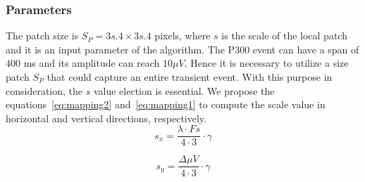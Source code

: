 \documentclass[entropy,article,submit,moreauthors,pdftex,10pt,a4paper]{mdpi}
\begin{document}


\subsubsection{Parameters}




The patch size is $S_P = 3s.4 \times 3s.4$ pixels, where $s$ is the scale of the local patch and it is an input parameter of the algorithm. The P300 event can have a span of $400$ ms and its amplitude can reach $ 10 \mu V $.  Hence it is necessary to utilize a size patch $S_P$ that could capture an entire transient event. With this purpose in consideration, the $s$ value election is essential.
We propose the equations~\ref{eq:mapping2} and~\ref{eq:mapping1} to compute the scale value in horizontal and vertical directions, respectively. 
\begin{equation}
s_x = \frac{\lambda \cdot Fs}{4 \cdot 3} \cdot \gamma
\label{eq:mapping2}
\end{equation}

\begin{equation}
s_y= \frac{\Delta \mu V}{4 \cdot 3} \cdot \gamma 
\label{eq:mapping1}
\end{equation}
\end{document}
